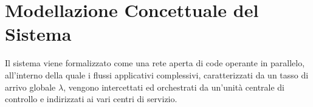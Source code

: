 ﻿\documentclass[a4paper,12pt]{article}
\begin{document}
\clearpage


\section{Modellazione Concettuale del Sistema}
Il sistema viene formalizzato come una rete aperta di code operante in parallelo, all'interno della quale i flussi applicativi complessivi, caratterizzati da un tasso di arrivo globale $\lambda$, vengono intercettati ed orchestrati da un'unità centrale di controllo e indirizzati ai vari centri di servizio.

\end{document}
